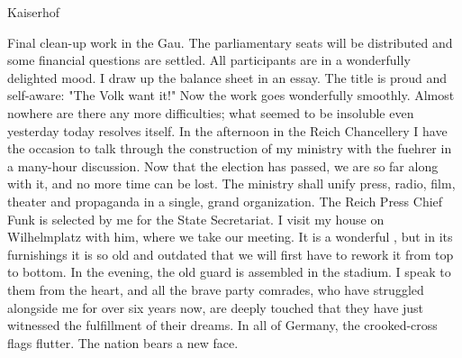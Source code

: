 Kaiserhof

Final clean-up work in the Gau. The parliamentary seats will be distributed and some financial questions are settled. All participants are in a wonderfully delighted mood. I draw up the balance sheet in an essay. The title is proud and self-aware: "The Volk want it!" Now the work goes wonderfully smoothly. Almost nowhere are there any more difficulties; what seemed to be insoluble even yesterday today resolves itself. In the afternoon in the Reich Chancellery I have the occasion to talk through the construction of my ministry with the fuehrer in a many-hour discussion. Now that the election has passed, we are so far along with it, and no more time can be lost. The ministry shall unify press, radio, film, theater and propaganda in a single, grand organization. The Reich Press Chief Funk is selected by me for the State Secretariat. I visit my house on Wilhelmplatz with him, where we take our meeting. It is a wonderful , but in its furnishings it is so old and outdated that we will first have to rework it from top to bottom. In the evening, the old guard is assembled in the stadium. I speak to them from the heart, and all the brave party comrades, who have struggled alongside me for over six years now, are deeply touched that they have just witnessed the fulfillment of their dreams. In all of Germany, the crooked-cross flags flutter. The nation bears a new face.
